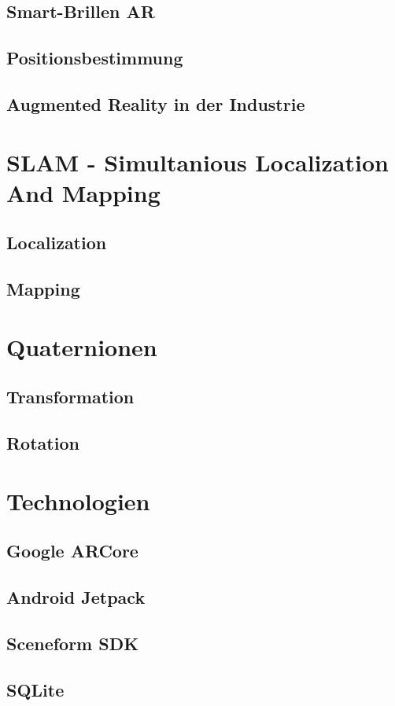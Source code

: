 \subsection*{Smart-Brillen AR}


\subsection{Positionsbestimmung}

\subsection{Augmented Reality in der Industrie}

\section{SLAM - Simultanious Localization And Mapping}
\label{chap:SLAM}
\subsection{Localization}
\subsection{Mapping}

\section{Quaternionen}
\label{chap:Quaternionen}
\subsection{Transformation}
\subsection{Rotation}

\section{Technologien}
\label{chap:Technologien}
\subsection{Google ARCore}
\subsection{Android Jetpack}
\subsection{Sceneform SDK}
\subsection{SQLite}


